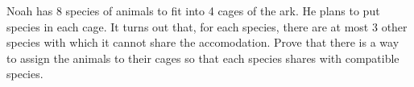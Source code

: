 Noah has 8 species of animals to fit into 4 cages of the ark. He plans to put species in each cage. It turns out that, for each species, there are at most 3 other species with which it cannot share the accomodation. Prove that there is a way to assign the animals to their cages so that each species shares with compatible species.